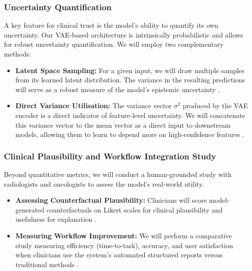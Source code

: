 \documentclass[11pt, a4paper]{article}
\begin{document}
\subsubsection{Uncertainty Quantification}
A key feature for clinical trust is the model's ability to quantify its own uncertainty. Our VAE-based architecture is intrinsically probabilistic and allows for robust uncertainty quantification. We will employ two complementary methods:
\begin{itemize}
    \item \textbf{Latent Space Sampling:} For a given input, we will draw multiple samples from its learned latent distribution. The variance in the resulting predictions will serve as a robust measure of the model's epistemic uncertainty \cite{BustinMeyer2025}.
    \item \textbf{Direct Variance Utilisation:} The variance vector $\sigma^2$ produced by the VAE encoder is a direct indicator of feature-level uncertainty. We will concatenate this variance vector to the mean vector as a direct input to downstream models, allowing them to learn to depend more on high-confidence features \cite{FriedrichFrisch2024}.
\end{itemize}

\subsubsection{Clinical Plausibility and Workflow Integration Study}
Beyond quantitative metrics, we will conduct a human-grounded study with radiologists and oncologists to assess the model's real-world utility.
\begin{itemize}
    \item \textbf{Assessing Counterfactual Plausibility:} Clinicians will score model-generated counterfactuals on Likert scales for clinical plausibility and usefulness for explanation \cite{GuoDeng2024, RossiLopez2024}.
    \item \textbf{Measuring Workflow Improvement:} We will perform a comparative study measuring efficiency (time-to-task), accuracy, and user satisfaction when clinicians use the system's automated structured reports versus traditional methods \cite{UnknownAuthor2020}.
\end{itemize}
\end{document}
